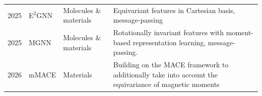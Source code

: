 \begin{longtable}{p{1.25cm}p{2.5cm}p{3cm}p{10.25cm}}
\footnotesize{2025} &
\footnotesize{E$^2$GNN\cite{yang2025efficient}} &
\footnotesize{Molecules \& materials}&
\footnotesize{Equivariant features in Cartesian basis, message-passing}\\

\footnotesize{2025} &
\footnotesize{MGNN\cite{chang2025mgnn}} &
\footnotesize{Molecules \& materials}&
\footnotesize{Rotationally invariant features with moment-based representation learning, message-passing.}\\

\footnotesize{2026} &
\footnotesize{mMACE\cite{ho2026equivariant}}&
\footnotesize{Materials}&
\footnotesize{Building on the MACE framework to additionally take into account the equivariance of magnetic moments}
\end{longtable}


